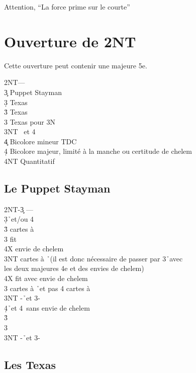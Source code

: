 \documentclass[a4paper]{article}
\begin{document}
Attention, ``La force prime sur le courte''

\section{Ouverture de 2NT}

Cette ouverture peut contenir une majeure 5e.

\begin{bidtable}
2NT---\\
3\c \> Puppet Stayman\\
3\d \> Texas \h \\
3\h \> Texas \s \\
3\s \> Texas pour 3N\\
3NT \s\ et 4\h \\
4\c \> Bicolore mineur TDC\\
4\d \> Bicolore majeur, limité à la manche ou certitude de chelem\\
4NT \> Quantitatif
\end{bidtable}

\subsection{Le Puppet Stayman}

\begin{bidtable}
2NT-3\c \> ---\\
3\d {}\h\ et/ou 4\s \+\\
3\h {} cartes à \s \+\\
3\s \> fit \s \+\\
4X \> envie de chelem\-\\
3NT  cartes à \h\ (il est donc nécessaire de passer par 3\h\ avec\\
\>les deux majeures 4e et des envies de chelem)\\
\>4X fit avec envie de chelem\-\\
3\s {} cartes à \h\ et pas 4 cartes à \s \\
3NT -\h\ et 3-\s \\
4\d {}\h\ et 4\s\ sans envie de chelem\-\\
3\h {}\h \\
3\s {}\s \\
3NT -\h\ et 3-\s 
\end{bidtable}

\subsection{Les Texas}
\end{document}
